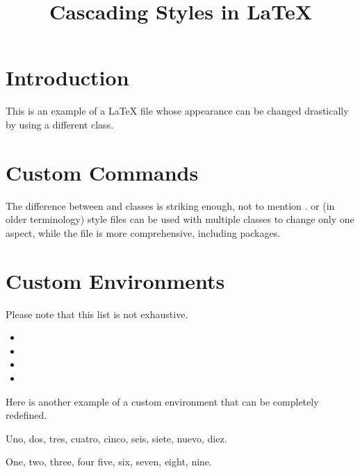 \documentclass[rainbowtitle]{example1}
\title{Cascading Styles in \LaTeX}
\begin{document}
\maketitle

\section{Introduction}

This is an example of a \LaTeX{} file whose appearance can be changed drastically by using a different class.

\section{Custom Commands}

The difference between  and  classes is striking enough, not to mention .
 or (in older terminology) style files can be used with multiple classes to change only one aspect, while the  file is more comprehensive, including packages.

\section{Custom Environments}

\begin{notabene}
Please note that this list is not exhaustive.
\end{notabene}

\begin{itemize}
\item {}
\item {}
\item {}
\item {}
\end{itemize}

Here is another example of a custom environment that can be completely redefined.

\begin{poemtranslation}
\begin{original}
Uno, dos, tres, cuatro, \eol
cinco, seis, siete, \eol
nuevo, diez. \eol
\end{original}
\begin{translation}
One, two, three, four \eol
five, six, seven, \eol
eight, nine.
\end{translation}
\end{poemtranslation}
\end{document}
